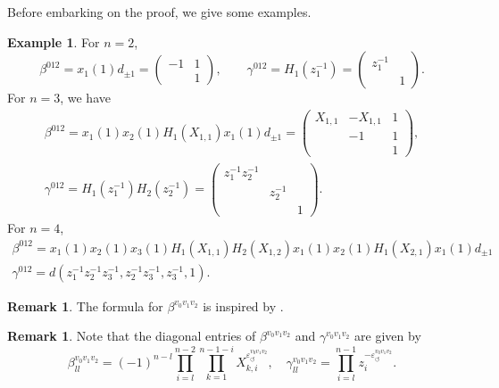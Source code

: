 \documentclass[12pt]{amsart}
\theoremstyle{definition}
\newtheorem{remark}[theorem]{Remark}
\newtheorem{example}[theorem]{Example}
\numberwithin{equation}{section}
\begin{document}
Before embarking on the proof, we give some examples.

\begin{example}For $n=2$,
\begin{equation}
\beta^{012}=x_1(1)d_{\pm 1}=\begin{pmatrix}-1&1\\&1\end{pmatrix},\qquad \gamma^{012}=H_1(z_1^{-1})=\begin{pmatrix}z_1^{-1}&\\&1\end{pmatrix}.
\end{equation}
For $n=3$, we have
\begin{equation}
\begin{gathered}
\beta^{012}=x_1(1)x_2(1)H_1(X_{1,1})x_1(1)d_{\pm 1}=
\begin{pmatrix}X_{1,1}&-X_{1,1}&1\\&-1&1\\&&1\end{pmatrix},
\\\gamma^{012}=
H_1(z_1^{-1})H_2(z_2^{-1})=\begin{pmatrix}z_1^{-1}z_2^{-1}&&\\&z_2^{-1}&\\&&1\end{pmatrix}.
\end{gathered}
\end{equation}
For $n=4$,
\begin{equation}
\begin{gathered}
\beta^{012}=x_1(1)x_2(1)x_3(1)H_1(X_{1,1})H_2(X_{1,2})x_1(1)x_2(1)H_1(X_{2,1})x_1(1)d_{\pm 1}\\ \gamma^{012}=d(z_1^{-1}z_2^{-1}z_3^{-1},z_2^{-1}z_3^{-1},z_3^{-1},1).
\end{gathered}
\end{equation}
\end{example}

\begin{remark}
The formula for $\beta^{v_0v_1v_2}$ is inspired by \cite[(9.14)]{FockGoncharov}.
\end{remark}

\begin{remark}\label{rm:DiagonalEntries}
Note that the diagonal entries of $\beta^{v_0v_1v_2}$ and $\gamma^{v_0v_1v_2}$ are given by
\begin{equation}
\beta^{v_0v_1v_2}_{ll}=(-1)^{n-l}\prod_{i=l}^{n-2}\prod_{k=1}^{n-1-i}X_{k,i}^{\varepsilon_\circlearrowleft^{v_0v_1v_2}},\quad \gamma_{ll}^{v_0v_1v_2}=\prod_{i=l}^{n-1}z_i^{-\varepsilon_\circlearrowleft^{v_0v_1v_2}}.
\end{equation}
\end{remark}
\end{document}
